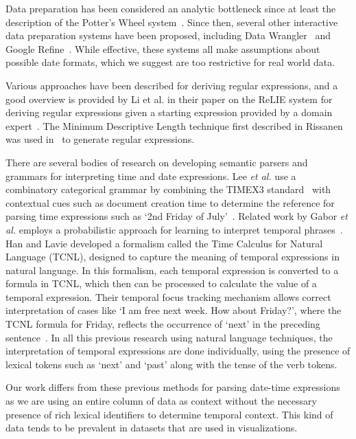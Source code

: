 Data preparation has been considered an analytic bottleneck since at least the description of the Potter's Wheel system~\cite{Raman:2001}. Since then, several other interactive data preparation systems have been proposed, including Data Wrangler~\cite{Kandel:2011} and Google Refine~\cite{Refine}. While effective, these systems all make assumptions about possible date formats, which we suggest are too restrictive for real world data.

Various approaches have been described for deriving regular expressions, and a good overview is provided by Li et al. in their paper on the ReLIE system for deriving regular expressions given a starting expression provided by a domain expert~\cite{Li:2008}. The Minimum Descriptive Length technique first described in Rissanen~\cite{Rissanen:1978} was used in~\cite{Raman:2001} to generate regular expressions. 

There are several bodies of research on developing semantic parsers and grammars for interpreting time and date expressions. Lee \textit{et al.} use a combinatory categorical grammar by combining the TIMEX3 standard~\cite{timex3} with contextual cues such as document creation time to determine the reference for parsing time expressions such as `2nd Friday of July'~\cite{LeeADZ14}. Related work by Gabor \textit{et al.} employs a probabilistic approach for learning to interpret temporal phrases~\cite{Angeli:2012}. Han and Lavie developed a formalism called the Time Calculus for Natural Language (TCNL), designed to capture the meaning of temporal expressions in natural language. In this formalism, each temporal expression is converted to a formula in TCNL, which then can be processed to calculate the value of a temporal expression. Their temporal focus tracking mechanism allows correct interpretation of cases like `I am free next week. How
about Friday?', where the TCNL formula for Friday, reflects the occurrence of `next' in the preceding sentence~\cite{Han:2004}.  In all this previous research using natural language techniques, the interpretation of temporal expressions are done individually, using the presence of lexical tokens such as `next' and `past' along with the tense of the verb tokens.

Our work differs from these previous methods for parsing date-time expressions as we are using an entire column of data as context without the necessary presence of rich lexical identifiers to determine temporal context. This kind of data tends to be prevalent in datasets that are used in visualizations. 
